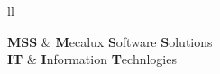 \documentclass[
11pt, %
oneside, %
spanish, %
singlespacing, %
headsepline, %
]{MastersDoctoralThesis} %
\begin{document}


\tableofcontents %




\begin{abbreviations}{ll} %


\textbf{MSS} & \textbf{M}ecalux \textbf{S}oftware \textbf{S}olutions\\
\textbf{IT} & \textbf{I}nformation \textbf{T}echnlogies\\

\end{abbreviations}
\end{document}
